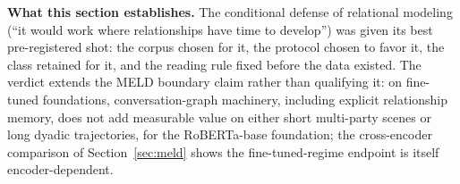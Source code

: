 \noindent\textbf{What this section establishes.} The conditional defense of relational modeling (``it would work where relationships have time to develop'') was given its best pre-registered shot: the corpus chosen for it, the protocol chosen to favor it, the class retained for it, and the reading rule fixed before the data existed. The verdict extends the MELD boundary claim rather than qualifying it: on fine-tuned foundations, conversation-graph machinery, including explicit relationship memory, does not add measurable value on either short multi-party scenes or long dyadic trajectories, for the RoBERTa-base foundation; the cross-encoder comparison of Section~\ref{sec:meld} shows the fine-tuned-regime endpoint is itself encoder-dependent.
